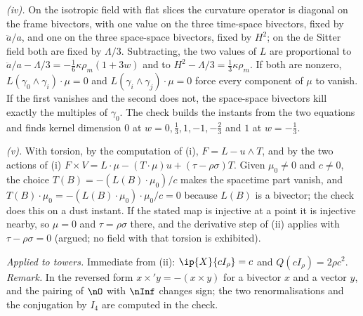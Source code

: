\emph{(iv).} On the isotropic field with flat slices the curvature operator is diagonal on the frame bivectors, with one value on the three time-space bivectors, fixed by $\ddot a/a$, and one on the three space-space bivectors, fixed by $H^{2}$; on the de Sitter field both are fixed by $\Lambda/3$. Subtracting, the two values of $L$ are proportional to $\ddot a/a - \Lambda/3 = -\tfrac16\kappa\rho_{m}(1 + 3w)$ and to $H^{2} - \Lambda/3 = \tfrac13\kappa\rho_{m}$. If both are nonzero, $L(\gamma_{0}\wedge\gamma_{i})\cdot\mu = 0$ and $L(\gamma_{i}\wedge\gamma_{j})\cdot\mu = 0$ force every component of $\mu$ to vanish. If the first vanishes and the second does not, the space-space bivectors kill exactly the multiples of $\gamma_{0}$. The check builds the instants from the two equations and finds kernel dimension $0$ at $w = 0, \tfrac13, 1, -1, -\tfrac23$ and $1$ at $w = -\tfrac13$.

\emph{(v).} With torsion, by the computation of (i), $F = L - u\wedge T$, and by the two actions of (i) $F\times V = L\cdot\mu - (T\cdot\mu)u + (\tau - \rho\sigma)T$. Given $\mu_{0} \neq 0$ and $c \neq 0$, the choice $T(B) = -(L(B)\cdot\mu_{0})/c$ makes the spacetime part vanish, and $T(B)\cdot\mu_{0} = -(L(B)\cdot\mu_{0})\cdot\mu_{0}/c = 0$ because $L(B)$ is a bivector; the check does this on a dust instant. If the stated map is injective at a point it is injective nearby, so $\mu = 0$ and $\tau = \rho\sigma$ there, and the derivative step of (ii) applies with $\tau - \rho\sigma = 0$ (argued; no field with that torsion is exhibited).

\emph{Applied to towers.} Immediate from (ii): $\ip{X}{cI_{\rho}} = c$ and $Q(cI_{\rho}) = 2\rho c^{2}$. \emph{Remark.} In the reversed form $x\times' y = -(x\times y)$ for a bivector $x$ and a vector $y$, and the pairing of $\nO$ with $\nInf$ changes sign; the two renormalisations and the conjugation by $I_{4}$ are computed in the check.
